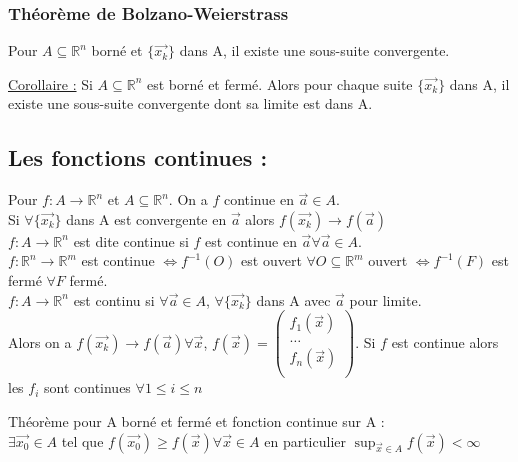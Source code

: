 \documentclass[../main.tex]{subfiles}
\begin{document}
\subsubsection{Théorème de Bolzano-Weierstrass}
\begin{theorem}
Pour $A\subseteq \mathbb{R}^n$ borné et $\{\vec{x_k}\}$ dans A, il existe une sous-suite convergente.\end{theorem}

\quad \underline{Corollaire :} Si $A\subseteq \mathbb{R}^n$ est borné et fermé. Alors pour chaque suite $\{\vec{x_k}\}$ dans A, il existe une sous-suite convergente dont sa limite est dans A.\\


\subsection{Les fonctions continues :}
Pour $f:A\rightarrow \mathbb{R}^n$ et $A\subseteq \mathbb{R}^n$. On a $f$ continue en $\vec{a} \in A$.\\
Si $\forall \{\vec{x_k}\}$ dans A est convergente en $\vec{a}$ alors $f(\vec{x_k}) \rightarrow f(\vec{a})$ \\

$f:A\rightarrow \mathbb{R}^n$ est dite continue si $f$ est continue en $\vec{a}\forall \vec{a} \in A$.\\

$f:\mathbb{R}^n \rightarrow \mathbb{R}^m$ est continue $\Leftrightarrow f^{-1}(O)$ est ouvert $\forall O\subseteq \mathbb{R}^m$ ouvert $\Leftrightarrow f^{-1}(F)$ est fermé $\forall F$ fermé.\\

$f:A\rightarrow \mathbb{R}^n$ est continu si $\forall \vec{a} \in A$, $\forall \{\vec{x_k}\}$ dans A avec $\vec{a}$ pour limite.\\
Alors on a $f(\vec{x_k}) \rightarrow f(\vec{a}) \forall \vec{x}$, $f(\vec{x}) = \begin{pmatrix}
    f_1(\vec{x}) \\
    \dots\\
    f_n(\vec{x})\\
\end{pmatrix}$. Si $f$ est continue alors les $f_i$ sont continues $\forall 1\leq i \leq n$\\

\begin{theorem}Théorème pour A borné et fermé et fonction continue sur A :\\
$\exists \vec{x_0} \in A$ tel que $f(\vec{x_0}) \geq f(\vec{x}) \forall \vec{x} \in A$ en particulier $\sup_{\vec{x}\in A} f(\vec{x}) < \infty$\end{theorem}
\end{document}

